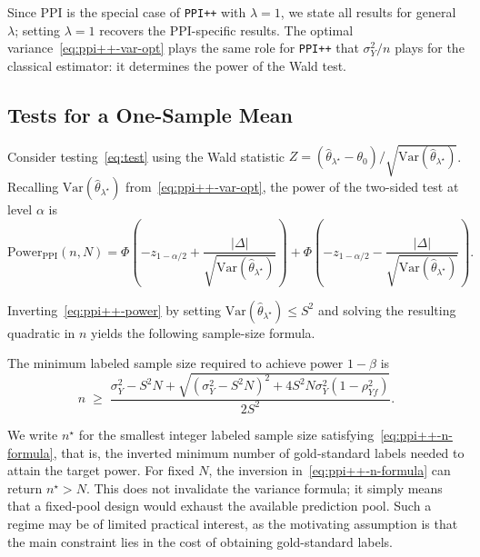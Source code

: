 \documentclass[12pt]{article}
\newcommand{\Var}{\mathrm{Var}}
\newcommand{\wh}{\widehat}
\begin{document}
Since PPI is the special case of \texttt{PPI++} with $\lambda = 1$, we state
all results for general $\lambda$; setting $\lambda = 1$ recovers the
PPI-specific results. The optimal variance~\eqref{eq:ppi++-var-opt} plays the
same role for \texttt{PPI++} that $\sigma_Y^2/n$ plays for the classical
estimator: it determines the power of the Wald test.

\subsection{Tests for a One-Sample Mean}

\begin{proposition}\label{prop:ppi++-power}
Consider testing~\eqref{eq:test} using the Wald statistic
$Z = (\wh{\theta}_{\lambda^\star} - \theta_0)
/ \sqrt{\Var(\wh{\theta}_{\lambda^\star})}$.
Recalling $\Var(\wh{\theta}_{\lambda^\star})$ from~\eqref{eq:ppi++-var-opt}, the power of the two-sided test at level $\alpha$ is
\begin{equation}\label{eq:ppi++-power}
\mathrm{Power}_{\mathrm{PPI}}(n, N)
= \Phi\!\left(-z_{1-\alpha/2}
  + \frac{|\Delta|}{\sqrt{\Var(\wh{\theta}_{\lambda^\star})}}\right)
+ \Phi\!\left(-z_{1-\alpha/2}
  - \frac{|\Delta|}{\sqrt{\Var(\wh{\theta}_{\lambda^\star})}}\right).
\end{equation}
\end{proposition}

Inverting~\eqref{eq:ppi++-power} by setting
$\Var(\wh{\theta}_{\lambda^\star}) \le S^2$ and solving the resulting quadratic
in $n$ yields the following sample-size formula.

\begin{proposition}\label{prop:ppi++-n}
The minimum labeled sample size required to achieve power $1-\beta$ is
\begin{equation}\label{eq:ppi++-n-formula}
n \;\ge\;
\frac{\sigma_Y^2 - S^2 N
  + \sqrt{(\sigma_Y^2 - S^2 N)^2
    + 4 S^2 N \sigma_Y^2 (1 - \rho_{Yf}^2)}}
{2 S^2}.
\end{equation}
\end{proposition}

We write $n^\star$ for the smallest integer labeled sample size
satisfying~\eqref{eq:ppi++-n-formula}, that is, the inverted minimum
number of gold-standard labels needed to attain the target power. For
fixed $N$, the inversion in~\eqref{eq:ppi++-n-formula} can return
$n^\star > N$. This does not invalidate the variance formula; it simply means that a fixed-pool design would exhaust the available
prediction pool. Such a regime may be of limited practical interest,
as the motivating assumption is that the main constraint lies in the
cost of obtaining gold-standard labels.
\end{document}

